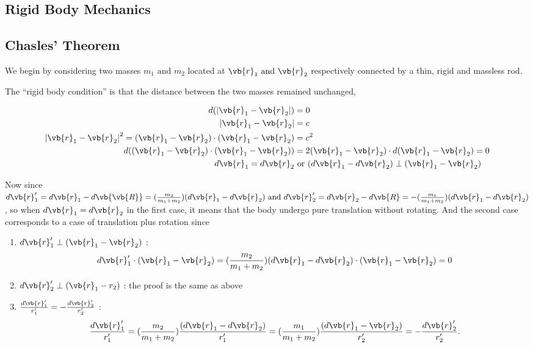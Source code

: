 \documentclass[a4paper,12pt]{report}
\begin{document}
\begin{appendices}
\chapter{Rigid Body Mechanics} 
\section{Chasles' Theorem} \label{ap1}

We begin by considering two masses \(m_{1} \text{ and }  m_{2} \) located at \(\vb{r} _{1} \text{ and } \vb{r} _{2}  \) respectively connected by a thin, rigid and massless rod. 

The ``rigid body condition'' is that the distance between the two masses remained unchanged, \ie 

\begin{equation}
\begin{aligned}
	d(\left| \vb{r} _{1} - \vb{r} _{2}  \right| ) &= 0 \\
	\left| \vb{r} _{1} - \vb{r} _{2}  \right| &= c \\
	\left| \vb{r} _{1} - \vb{r} _{2}  \right| ^2 = (\vb{r} _{1} - \vb{r} _{2} ) \cdot (\vb{r} _{1} -\vb{r} _{2} ) &= c^2 \\
	d((\vb{r} _{1} - \vb{r} _{2} ) \cdot (\vb{r} _{1} -\vb{r} _{2} ))& = 2(\vb{r} _{1} - \vb{r} _{2} ) \cdot d(\vb{r} _{1} - \vb{r} _{2} ) = 0\\
	d\vb{r} _{1} = d\vb{r} _{2} &\text { or } (d\vb{r} _{1} - d\vb{r} _{2} ) \perp (\vb{r} _{1} - \vb{r} _{2} ) 
\end{aligned}
\end{equation}

Now since \(d\vb{r} '_{1} = d\vb{r} _{1} - d\vb{\vb{R} } = (\frac{m_{2} }{m_{1} + m_{2} }) (d\vb{r} _{1} - d\vb{r} _{2} ) \text{ and }  d\vb{r} '_{2} = d\vb{r} _{2} - d\vb{R} = -(\frac{m_{1} }{m_{1} + m_{2} } )(d\vb{r} _{1} - d\vb{r} _{2} )\), so when \(d\vb{r} _{1} = d\vb{r} _{2} \) in the first case, it means that the body undergo pure translation without rotating. And the second case corresponds to a case of translation plus rotation since 

\begin{enumerate}
	\item \(d\vb{r}'_{1} \perp (\vb{r} _{1} - \vb{r} _{2} ) \) :
		\begin{equation}
			d\vb{r} '_{1} \cdot (\vb{r} _{1} -\vb{r} _{2} ) = (\frac{m_{2} }{m_{1} + m_{2} } )(d\vb{r} _{1} - d\vb{r} _{2} )\cdot (\vb{r} _{1} - \vb{r} _{2} ) = 0
		\end{equation}
	\item \(d\vb{r} '_{2} \perp (\vb{r} _{1} - r_{2} )\) : the proof is the same as above
	\item \(\frac{d\vb{r} '_{1} }{r'_{1} } = -\frac{d\vb{r} '_{2} }{r'_{2} } \) : 
		\begin{equation}
			\frac{d\vb{r} '_{1} }{r'_{1} } = (\frac{m_{2} }{m_{1} + m_{2} } )\frac{(d\vb{r} _{1} - d\vb{r} _{2} )}{r'_{1} } = (\frac{m_{1} }{m_{1} + m_{2} } )\frac{(d\vb{r} _{1} -\vb{r} _{2} )}{r'_{2} } = -\frac{d\vb{r} '_{2} }{r'_{2} } .
		\end{equation}		
\end{enumerate}


\end{appendices}
\end{document}
